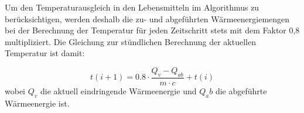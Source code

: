 Um den Temperaturausgleich in den Lebensmitteln im Algorithmus zu berücksichtigen, werden deshalb die zu- und abgeführten
Wärmeenergiemengen bei der Berechnung der Temperatur für jeden Zeitschritt stets mit dem Faktor 0,8 multipliziert.
Die Gleichung zur stündlichen Berechnung der aktuellen Temperatur ist damit:

\begin{equation}
	t(i+1) = 0.8 \cdot \frac{Q_v - Q_{ab}}{m \cdot c} + t(i)
\label{tns}
\end{equation}
wobei $Q_v$ die aktuell eindringende Wärmeenergie und $Q_ab$ die abgeführte Wärmeenergie ist.

